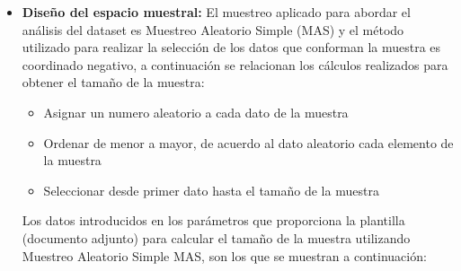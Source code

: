 \documentclass[conference]{IEEEtran}\usepackage[]{graphicx}\usepackage[]{color}
\begin{document}
\begin{itemize}
	\item \textbf {Diseño del espacio muestral:}
	El muestreo aplicado para abordar el análisis del dataset es Muestreo Aleatorio Simple (MAS) y el método utilizado para realizar la selección de los datos que conforman la muestra es coordinado negativo, a continuación se relacionan los cálculos realizados para obtener el tamaño de la muestra:
	\bigskip
	\begin{itemize}
		\item Asignar un numero aleatorio a cada dato de la muestra
		\item Ordenar de menor a mayor, de acuerdo al dato aleatorio cada elemento de la muestra
		\item Seleccionar desde primer dato hasta el tamaño de la muestra
	\end{itemize}
	\bigskip
	Los datos introducidos en los parámetros que proporciona la plantilla (documento adjunto) para calcular el tamaño de la muestra utilizando Muestreo Aleatorio Simple MAS, son los que se muestran a continuación:\\
	

\end{itemize}
\end{document}
